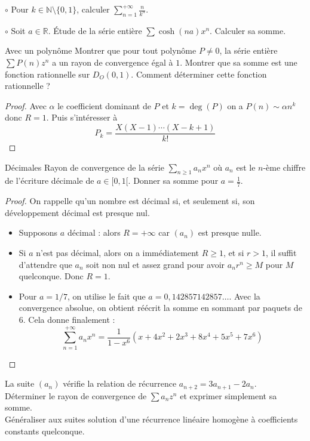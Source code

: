 \documentclass[french,a4paper]{article}
\newcommand{\N}{\mathbb{N}}
\newcommand{\R}{\mathbb{R}}
\theoremstyle{plain}
\theoremstyle{definition}
\theoremstyle{remark}
\begin{document}
\begin{ex}[Moulin.SE.15]{$\circ$}
	Pour $k\in\N\setminus\{0,1\}$, calculer $\displaystyle\sum_{n=1}^{+\infty}\frac{n}{k^n}$.
\end{ex}

\begin{ex}[Moulin.SE.16]{$\circ$}
	Soit $a\in\R$. Étude de la série entière $\displaystyle\sum \cosh(na)x^n$. Calculer sa somme.
\end{ex}

\begin{ex}[Moulin.SE.17]{Avec un polynôme}
	Montrer que pour tout polynôme $P\ne 0$, la série entière $\sum P(n)z^n$ a un rayon de convergence égal à $1$. Montrer que sa somme est une fonction rationnelle sur $D_O(0,1)$. Comment déterminer cette fonction rationnelle ?
\end{ex}
\begin{proof}
	Avec $\alpha$ le coefficient dominant de $P$ et $k=\deg(P)$ on a $P(n)\sim\alpha n^k$ donc $R=1$. Puis s'intéresser à $$P_k=\frac{X(X-1)\cdots(X-k+1)}{k!}$$
\end{proof}

\begin{ex}[Moulin.SE.18]{Décimales}
	Rayon de convergence de la série $\displaystyle\sum_{n\geqslant 1}a_nx^n$ où $a_n$ est le $n$-ème chiffre de l'écriture décimale de $a\in[0,1[$. Donner sa somme pour $a=\frac{1}{7}$.
\end{ex}
\begin{proof}
	On rappelle qu'un nombre est décimal si, et seulement si, son développement décimal est presque nul.
	\begin{itemize}
		\item Supposons $a$ décimal : alors $R=+\infty$ car $(a_n)$ est presque nulle.
		\item Si $a$ n'est pas décimal, alors on a immédiatement $R\geqslant 1$, et si $r>1$, il suffit d'attendre que $a_n$ soit non nul et assez grand pour avoir $a_nr^n\geqslant M$ pour $M$ quelconque. Donc $R=1$.
		\item Pour $a=1/7$, on utilise le fait que $a=0,142857142857\ldots$. Avec la convergence absolue, on obtient réécrit la somme en sommant par paquets de 6. Cela donne finalement : $$\sum_{n=1}^{+\infty}a_nx^n=\frac{1}{1-x^6}\left(x+4x^2+2x^3+8x^4+5x^5+7x^6\right)$$
	\end{itemize}
\end{proof}

\begin{ex}[Moulin.SE.19]{}
	La suite $(a_n)$ vérifie la relation de récurrence $a_{n+2}=3a_{n+1}-2a_n$. \\ Déterminer le rayon de convergence de $\displaystyle\sum a_nz^n$ et exprimer simplement sa somme. \\
	Généraliser aux suites solution d'une récurrence linéaire homogène à coefficients constants quelconque.
\end{ex}
\end{document}
